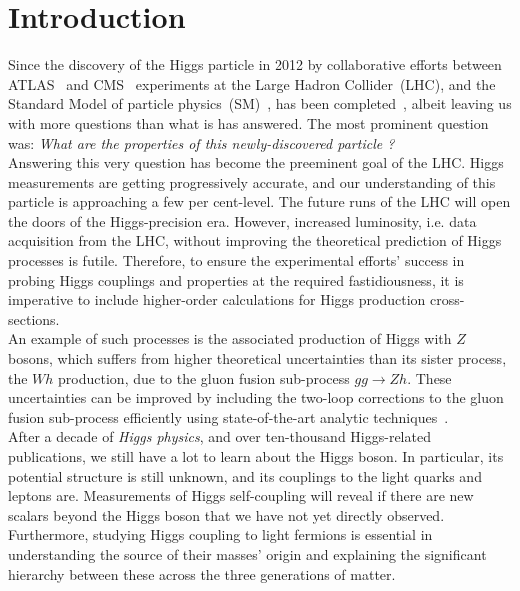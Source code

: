 

\chapter{Introduction}
Since the discovery of the Higgs particle in 2012 by collaborative efforts between ATLAS~\cite{ATLAS:2012yve} and CMS~\cite{CMS:2012qbp} experiments at the { L}arge { H}adron {C}ollider~(LHC), and the Standard Model of particle physics~(SM)~\cite{salam1,salam2,PhysRevLett.19.1264}, has been completed~\cite{PhysRevLett.13.321,PhysRevLett.13.508,HIGGS1964132,PhysRevLett.13.585,Guralnik:2009jd}, albeit leaving us with more questions than what is has answered. The most prominent question was: \textit{What are the properties of this newly-discovered particle ?}\\
%
Answering this very question has become the preeminent goal of the LHC. Higgs measurements are getting progressively accurate, and our understanding of this particle is approaching a few per cent-level. The future runs of the LHC will open the doors of the Higgs-precision era. However, increased luminosity, i.e. data acquisition from the LHC, without improving the theoretical prediction of Higgs processes is futile. Therefore, to ensure the experimental efforts' success in probing Higgs couplings and properties at the required fastidiousness, it is imperative to include higher-order calculations for Higgs production cross-sections. \\ 
An example of such processes is the associated production of Higgs with $Z$ bosons, which suffers from higher theoretical uncertainties than its sister process, the $Wh$ production, due to the gluon fusion sub-process $ gg \to Zh$. These uncertainties can be improved by including the two-loop corrections to the gluon fusion sub-process efficiently using state-of-the-art analytic techniques~\cite{Bonciani:2018omm}. 
%
\\ After a decade of \emph{Higgs physics}, and over ten-thousand Higgs-related publications, we still have a lot to learn about the Higgs boson.  In particular, its potential structure is still unknown, and its couplings to the light quarks and leptons are. Measurements of Higgs self-coupling will reveal if there are new scalars beyond the Higgs boson that we have not yet directly observed. Furthermore, studying Higgs coupling to light fermions is essential in understanding the source of their masses' origin and explaining the significant hierarchy between these across the three generations of matter. \\ 
